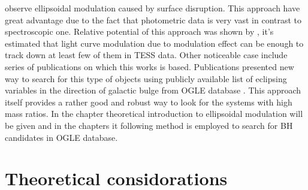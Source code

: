 \documentclass{pracalicmgr}
\begin{document}
observe ellipsoidal modulation caused by surface disruption. This approach have great advantage due to the fact that photometric data is very vast in contrast to spectroscopic one.
Relative potential of this approach was shown by \citep{masuda_prospects_2019}, it's estimated that light curve modulation due to modulation effect can be enough to track down
at least few of them in TESS data. Other noticeable case include series of publications \citep{gomel_search_2021,gomel_search_2021-1,gomel_search_2021-2} on which this works is based.
Publications presented new way to search for this type of objects using publicly available list of eclipsing variables in the direction of galactic bulge from OGLE database
 \citep{soszynski_ogle_2016}. This approach itself provides a rather good and robust way to look for the systems with high mass ratios. In the chapter \label{theo} theoretical
introduction to ellipsoidal modulation will be given and in the chapters it following method is employed to search for BH candidates in OGLE database.
\chapter{Theoretical considorations}\label{theo}
\end{document}
